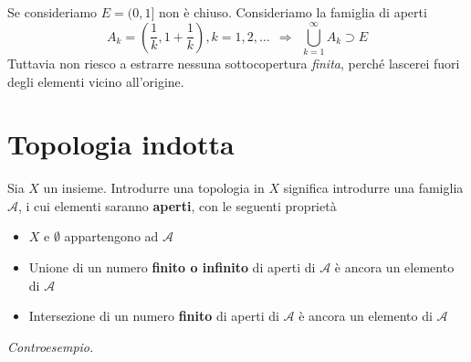 \documentclass[10pt,a4paper,twoside,openright]{book}
\begin{document}
Se consideriamo $\displaystyle E=( 0,1]$ non è chiuso. Consideriamo la famiglia di aperti
\begin{equation*}
A_{k} =\left(\frac{1}{k},1+\frac{1}{k}\right),k=1,2,\dotsc \ \ \Rightarrow \ \ \bigcup ^{\infty }_{k=1} A_{k} \supset E
\end{equation*}
Tuttavia non riesco a estrarre nessuna sottocopertura \textit{finita}, perché lascerei fuori degli elementi vicino all'origine.
\section{Topologia indotta}

Sia $X$ un insieme. Introdurre una topologia in $X$ significa introdurre una famiglia $\mathcal{A}$, i cui elementi saranno \textbf{aperti}, con le seguenti proprietà
\begin{itemize}
\item $X$ e $\emptyset $ appartengono ad $\mathcal{A}$
\item Unione di un numero \textbf{finito o infinito} di aperti di $\mathcal{A}$ è ancora un elemento di $\mathcal{A}$
\item Intersezione di un numero \textbf{finito} di aperti di $\mathcal{A}$ è ancora un elemento di $\mathcal{A}$
\end{itemize}



\textit{Controesempio. }
\end{document}
